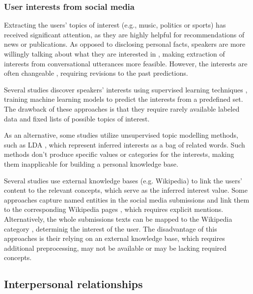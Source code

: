 
\subsubsection{User interests from social media}

Extracting the users' topics of interest (e.g., music, politics or sports) has received significant attention, as they are highly helpful for recommendations of news or publications. As opposed to disclosing personal facts, speakers are more willingly talking about what they are interested in \cite{seghouani2019determining, raghuram2016efficient}, making extraction of interests from conversational utterances more feasible. However, the interests are often changeable \cite{piao2018inferring}, requiring revisions to the past predictions.

Several studies discover speakers' interests using supervised learning techniques \cite{raghuram2016efficient}, training machine learning models to predict the interests from a predefined set. The drawback of these approaches is that they require rarely available labeled data and fixed lists of possible topics of interest.

As an alternative, some studies utilize unsupervised topic modelling methods, such as LDA \cite{weng2010twitterrank}, which represent inferred interests as a bag of related words. Such methods don't produce specific values or categories for the interests, making them inapplicable for building a personal knowledge base.

Several studies use external knowledge bases (e.g. Wikipedia) to link the users' content to the relevant concepts, which serve as the inferred interest value. Some approaches capture named entities in the social media submissions and link them to the corresponding Wikipedia pages \cite{kapanipathi2014user, michelson2010discovering}, which requires explicit mentions. Alternatively, the whole submissions texts can be mapped to the Wikipedia category \cite{seghouani2019determining}, determinig the interest of the user. The disadvantage of this approaches is their relying on an external knowledge base, which requires additional preprocessing, may not be available or may be lacking required concepts.

\subsection{Interpersonal relationships}

